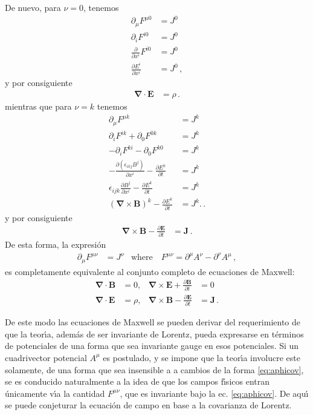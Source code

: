 \begin{frame}
De nuevo, para $\nu=0$, tenemos
\begin{align}
  \label{nohomME21}
    \partial_\mu F^{\mu0}&=J^0\nonumber\\
    \partial_iF^{i0}&=J^0\nonumber\\
    \frac{\partial}{\partial x^{i}}F^{i0}&=J^0\nonumber\\
    \frac{\partial E^{i}}{\partial x^{i}}&=J^0\,,
\end{align}
y por consiguiente
\begin{align}
   \boldsymbol{\nabla}\cdot\mathbf{E}&=\rho\,.
\end{align}
mientras que para $\nu=k$ tenemos
\begin{align}
\partial_\mu F^{\mu k}&=J^k\nonumber\\
\partial_iF^{ik}+\partial_0F^{0k}&=J^k\nonumber\\
-\partial_iF^{ki}-\partial_0F^{k0}&=J^k\nonumber\\
  -\frac{\partial (\epsilon_{ikj}B^j)}{\partial x^{i}}-\frac{\partial E^k}{\partial t}&=J^k\nonumber\\
\epsilon_{ijk}\frac{\partial B^j}{\partial x^{i}}-\frac{\partial E^k}{\partial t}&=J^k\nonumber\\
(\boldsymbol{\nabla}\times \mathbf{B})^k-\frac{\partial E^k}{\partial t}&=J^k.\,.
\end{align}
y por consiguiente
\begin{align}
  \boldsymbol{\nabla}\times \mathbf{B}-\frac{\partial\mathbf{E}}{\partial t}&=\mathbf{J}\,.
\end{align}
De esta forma, la expresión
\begin{align}
   \partial_\mu F^{\mu\nu}&=J^\nu& \text{where}\quad    F^{\mu\nu}=\partial^\mu A^\nu-\partial^\nu A^\mu\,,
\end{align}
es completamente equivalente al conjunto completo de ecuaciones de Maxwell:
\begin{align}
  \label{eq:hom_m_eq}
  \boldsymbol{\nabla}\cdot\mathbf{B}&=0,&\boldsymbol{\nabla}\times \mathbf{E}+\frac{\partial\mathbf{B}}{\partial t}&=0\\
  \label{eq:inhom_m_eq}
  \boldsymbol{\nabla}\cdot\mathbf{E}&=\rho,&\boldsymbol{\nabla}\times \mathbf{B}-\frac{\partial\mathbf{E}}{\partial t}&=\mathbf{J}\,.
\end{align}

\end{frame}




De este modo las ecuaciones de Maxwell se pueden derivar del requerimiento de que la teor\'\i a, adem\'as de ser invariante de Lorentz, pueda expresarse en t\'erminos de potenciales de una forma que sea invariante gauge en esos potenciales. Si un cuadrivector potencial $A^\mu$ es postulado, y se impone que la teor\'\i a involucre este solamente, de una forma que sea insensible a a cambios de la forma \eqref{eq:aphicov}, se es conducido naturalmente a la idea de que los campos f\'\i sicos entran \'unicamente v\'\i a la cantidad $F^{\mu\nu}$, que es invariante bajo la ec. \eqref{eq:aphicov}. De aqu\'\i{} se puede conjeturar la ecuaci\'on de campo en base a la covarianza de Lorentz. 

